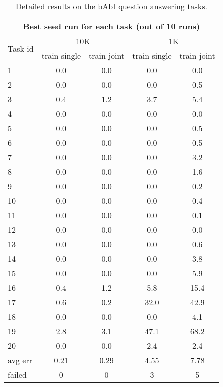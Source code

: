 \begin{table}[t!]
\centering
\caption{Detailed results on the bAbI question answering tasks.}
\label{tbl:babi_details}
\begin{subtable}{0.6\textwidth}
\centering
\begin{adjustbox}{max width=\textwidth}
\begin{tabular}{lcccc}
\toprule
\multicolumn{5}{c}{Best seed run for each task (out of 10 runs) } \\ \midrule
\multirow{2}{*}{ Task id } & \multicolumn{2}{c}{ 10K } & \multicolumn{2}{c}{ 1K } \\  \cmidrule{2-5}
& train single & train joint & train single & train joint \\ \midrule
1 & 0.0 & 0.0 & 0.0 & 0.0 \\
2 & 0.0 & 0.0 & 0.0 & 0.5 \\
3 & 0.4 & 1.2 & 3.7 & 5.4 \\
4 & 0.0 & 0.0 & 0.0 & 0.0 \\
5 & 0.0 & 0.0 & 0.0 & 0.5 \\
6 & 0.0 & 0.0 & 0.0 & 0.5 \\
7 & 0.0 & 0.0 & 0.0 & 3.2 \\
8 & 0.0 & 0.0 & 0.0 & 1.6 \\
9 & 0.0 & 0.0 & 0.0 & 0.2 \\
10 & 0.0 & 0.0 & 0.0 & 0.4 \\
11 & 0.0 & 0.0 & 0.0 & 0.1 \\
12 & 0.0 & 0.0 & 0.0 & 0.0 \\
13 & 0.0 & 0.0 & 0.0 & 0.6 \\
14 & 0.0 & 0.0 & 0.0 & 3.8 \\
15 & 0.0 & 0.0 & 0.0 & 5.9 \\
16 & 0.4 & 1.2 & 5.8 & 15.4 \\
17 & 0.6 & 0.2 & 32.0 & 42.9 \\
18 & 0.0 & 0.0 & 0.0 & 4.1 \\
19 & 2.8 & 3.1 & 47.1 & 68.2 \\
20 & 0.0 & 0.0 & 2.4 & 2.4 \\ \midrule
avg err & 0.21 & 0.29 & 4.55 & 7.78 \\ \midrule
failed & 0 & 0 & 3 & 5 \\
\bottomrule
\end{tabular}
\end{adjustbox}
\end{subtable}
\\
\vspace{10pt}
\begin{subtable}{0.6\textwidth}

\end{subtable}
\end{table}
